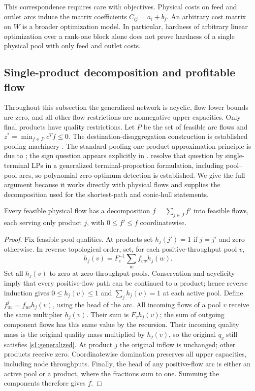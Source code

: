 This correspondence requires care with objectives. Physical costs on
feed and outlet arcs induce the matrix coefficients $C_{ij}=a_i+b_j$.
An arbitrary cost matrix on $W$ is a broader optimization model.
In particular, hardness of arbitrary linear optimization over a
rank-one block alone does not prove hardness of a single physical pool
with only feed and outlet costs.

\subsection{Single-product decomposition and profitable flow}\label{s1:triviality}

Throughout this subsection the generalized network is acyclic, flow
lower bounds are zero, and all other flow restrictions are nonnegative
upper capacities. Only final products have quality restrictions. Let
$P$ be the set of feasible arc flows and $z^*=\min_{f\in P}c^Tf\le0$.
The destination-disaggregation construction is established pooling
machinery \citep{boland2016-new-multi-commodity-flow-formulations}.
The standard-pooling one-product
approximation principle is due to
\citet{dey2015-analysis-of-milp-techniques-for}; the sign question appears
explicitly in \citet[Remark~2.2]{gupte2017-relaxations-and-discretizations-for-the}.
\citet[Proposition~4 and Theorem~2]{xiang2026-dive-and-fix} resolve that
question by single-terminal LPs in a generalized terminal-proportion
formulation, including pool--pool arcs, so polynomial zero-optimum
detection is established. We give the full argument because it works
directly with physical flows and supplies the decomposition used for
the shortest-path and conic-hull statements.

\begin{lemma}\label{s1:destination}
Every feasible physical flow has a decomposition
$f=\sum_{j\in J}f^j$ into feasible flows, each serving only product $j$,
with $0\le f^j\le f$ coordinatewise.
\end{lemma}
\begin{proof}
Fix feasible pool qualities. At products set
$h_j(j')=1$ if $j=j'$ and zero otherwise. In reverse topological order,
set, for each positive-throughput pool $v$,
\[
 h_j(v)=F_v^{-1}\sum_wf_{vw}h_j(w).
\]
Set all $h_j(v)$ to zero at zero-throughput pools. Conservation and
acyclicity imply that every positive-flow path can be continued to a
product; hence reverse induction gives $0\le h_j(v)\le1$ and
$\sum_jh_j(v)=1$ at each active pool. Define
$f^j_{uv}=f_{uv}h_j(v)$, using the head of the arc.
All incoming flows of a pool $v$ receive the same multiplier $h_j(v)$.
Their sum is $F_vh_j(v)$; the sum of outgoing component flows has this
same value by the recursion. Their incoming quality mass is the original
quality mass multiplied by $h_j(v)$, so the original $q_v$ still satisfies
\eqref{s1:generalized}. At product $j$ the original inflow is unchanged;
other products receive zero. Coordinatewise domination preserves all
upper capacities, including node throughputs. Finally, the head of any
positive-flow arc is either an active pool or a product, where the
fractions sum to one. Summing the components therefore gives $f$.
\end{proof}


